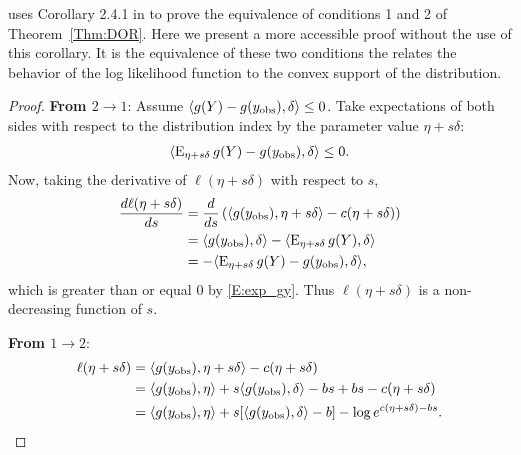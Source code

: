 \citeauthor{Geyer:gdor} uses Corollary 2.4.1 in \citet{Geyer:1990} to prove the 
equivalence of conditions 1 and 2 of Theorem~\ref{Thm:DOR}.  Here we present
a more accessible proof without the use of this corollary.  It is the equivalence
of these two conditions the relates the behavior of the log likelihood function
to the convex support of the distribution.
\begin{proof}
\textbf{From $2 \to 1$}:
Assume $\langle g(Y)-g(y_{\text{obs}}), \delta \rangle \leq 0$.  Take expectations of both sides
with respect to the distribution index by the parameter value $\eta + s \delta$:
\begin{align} \label{E:exp_gy}
\langle  \operatorname{E}_{\eta + s \delta} g(Y) - g(y_{\text{obs}}), \delta \rangle \leq 0.
\end{align}
Now, taking the derivative of $\ell( \eta + s\delta)$ with respect to $s$,
\begin{align*}
\frac{d \ell( \eta + s \delta)}{d s} &= \frac{d }{d s} 
			\left ( \langle g(y_{\text{obs}}), \eta+s \delta \rangle - c(\eta+s\delta)  \right )\\
	&= \langle g(y_{\text{obs}}), \delta \rangle - \langle  \operatorname{E}_{\eta+s\delta}g(Y),\delta  \rangle\\
	&= - \langle  \operatorname{E}_{\eta+s\delta}g(Y) - g(y_{\text{obs}}),\delta  \rangle,
\end{align*}
which is greater than or equal 0 by \eqref{E:exp_gy}.
Thus $\ell(\eta+s\delta)$ is a non-decreasing function of $s$.

\textbf{From $1 \to 2$}:
\begin{align}
	\ell( \eta+s\delta) &= \langle g(y_{\text{obs}}), \eta+s\delta \rangle - c(\eta+s\delta) \notag \\ 
	&= \langle g(y_{\text{obs}}), \eta \rangle + s \langle g(y_{\text{obs}}),\delta \rangle -bs +bs - c(\eta+s\delta) \notag \\ 
	&= \langle g(y_{\text{obs}}), \eta \rangle + s [\langle g(y_{\text{obs}}),\delta \rangle -b]  - \log e^{c(\eta+s\delta) -bs}. \label{E:expanded ell}
\end{align}


\end{proof}
